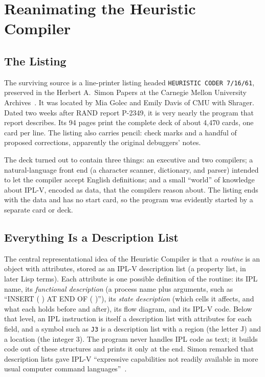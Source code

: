 \documentclass[11pt]{article}
\begin{document}
\section{Reanimating the Heuristic Compiler}
\label{sec:hc}

\subsection{The Listing}

The surviving source is a line-printer listing headed
\texttt{HEURISTIC CODER 7/16/61}, preserved in the Herbert A.~Simon
Papers at the Carnegie Mellon University
Archives~\cite{simonlisting1961}. It was located by Mia Golec and Emily
Davis of CMU with Shrager. Dated two weeks after RAND report
P-2349, it is very nearly the program that report describes. Its 94
pages print the complete deck of about 4,470 cards, one card per line.
The listing also carries pencil: check marks and a handful of proposed
corrections, apparently the original debuggers' notes.

The deck turned out to contain three things: an executive and two
compilers; a natural-language front end (a character scanner,
dictionary, and parser) intended to let the compiler accept English
definitions; and a small ``world'' of knowledge about IPL-V, encoded as
data, that the compilers reason about. The listing ends with the data
and has no start card, so the program was evidently started by a
separate card or deck.

\subsection{Everything Is a Description List}

The central representational idea of the Heuristic Compiler is that a
\emph{routine} is an object with attributes, stored as an IPL-V
description list (a property list, in later Lisp terms). Each attribute
is one possible definition of the routine: its IPL name, its
\emph{functional description} (a process name plus arguments, such as
``INSERT ( ) AT END OF ( )''), its \emph{state description} (which cells
it affects, and what each holds before and after), its flow diagram,
and its IPL-V code. Below that level, an IPL instruction is itself a
description list with attributes for each field, and a symbol such as
\texttt{J3} is a description list with a region (the letter J) and a
location (the integer 3). The program never handles IPL code as text;
it builds code out of these structures and prints it only at the end.
Simon remarked that description lists gave IPL-V ``expressive
capabilities not readily available in more usual computer command
languages''~\cite[p.~506]{simon1963jacm}.
\end{document}
